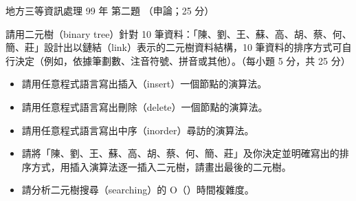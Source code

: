 \begin{pastexam}[label={px:df3-099-ds-02}]{地方三等資訊處理 99 年 第二題}
（申論；25 分）

請用二元樹（binary tree）針對 10 筆資料：「陳、劉、王、蘇、高、胡、蔡、何、簡、莊」設計出以鏈結（link）表示的二元樹資料結構，10 筆資料的排序方式可自行決定（例如，依據筆劃數、注音符號、拼音或其他）。（每小題 5 分，共 25 分）
\begin{itemize}[leftmargin=2.2em]
\item[㈠] 請用任意程式語言寫出插入（insert）一個節點的演算法。
\item[㈡] 請用任意程式語言寫出刪除（delete）一個節點的演算法。
\item[㈢] 請用任意程式語言寫出中序（inorder）尋訪的演算法。
\item[㈣] 請將「陳、劉、王、蘇、高、胡、蔡、何、簡、莊」及你決定並明確寫出的排序方式，用插入演算法逐一插入二元樹，請畫出最後的二元樹。
\item[㈤] 請分析二元樹搜尋（searching）的 O（）時間複雜度。
\end{itemize}
\end{pastexam}


